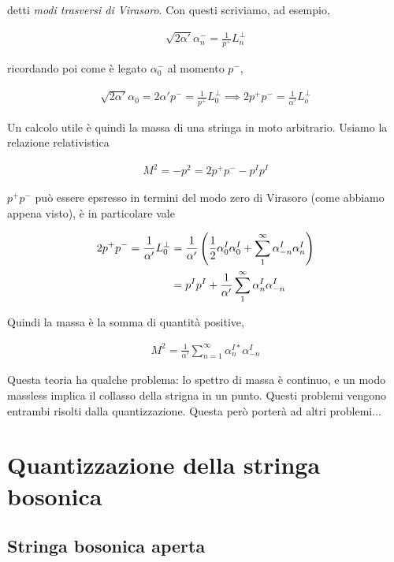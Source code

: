 \documentclass{report}
\begin{document}
detti \emph{modi trasversi di Virasoro}. Con questi scriviamo, ad esempio, 

\begin{align}
    \sqrt{2\alpha'} \alpha^-_n = \frac{1}{p^+}L_n^\perp  
\end{align}

ricordando poi come è legato \(\alpha_0^-\) al momento \(p^-\), 

\begin{align}
    \sqrt{2\alpha'}\alpha_0 = 2\alpha' p^- = \frac{1}{p^+}L^\perp_0 \implies 2p^+ p^- = \frac{1}{\alpha'}L_o^\perp
\end{align}

Un calcolo utile è quindi la massa di una stringa in moto arbitrario. Usiamo la relazione relativistica

\begin{align}
    M^2 = -p^2 = 2p^+p^- - p^I p^I 
\end{align}

\(p^+p^-\) può essere epsresso in termini del modo zero di Virasoro (come abbiamo appena visto), è in particolare vale 

\begin{align}
    2p^+ p^- = \frac{1}{\alpha'}L_0^\perp &= \frac{1}{\alpha'}\left(\frac{1}{2}\alpha^I_0 \alpha^I_0 +\sum_1^{\infty}\alpha_{-n}^I \alpha_n^I \right) \notag \\
    &= p^I p^I + \frac{1}{\alpha'}\sum_1^\infty \alpha^I_n \alpha^I_{-n}
\end{align}

Quindi la massa è la somma di quantità positive,

\begin{align}
    M^2 = \frac{1}{\alpha'}\sum_{n=1}^\infty \alpha^{I*}_n \alpha^I_{-n}
\end{align}

Questa teoria ha qualche problema: lo spettro di massa è continuo, e un modo massless implica il collasso della strigna in un punto. Questi problemi vengono entrambi risolti dalla quantizzazione. Questa però porterà ad altri problemi... 


\chapter{Quantizzazione della stringa bosonica}

\section{Stringa bosonica aperta}
\end{document}
